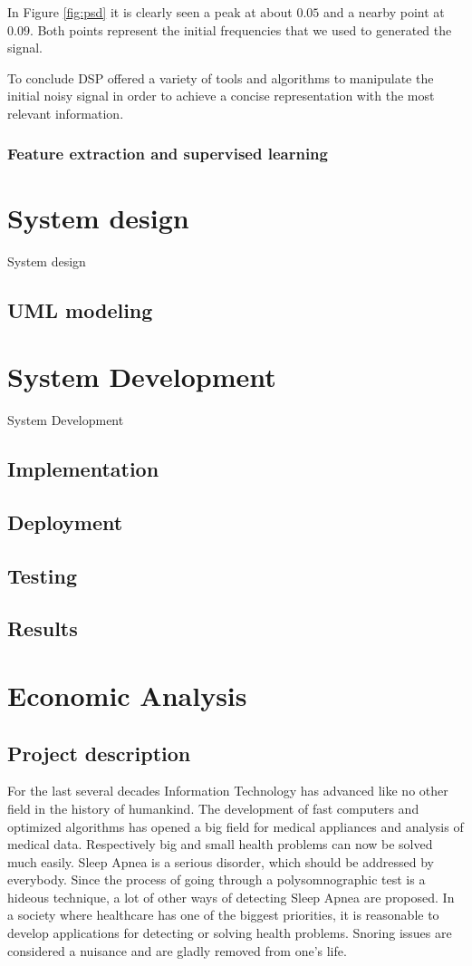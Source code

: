 \documentclass[12pt,a4paper]{report}
\begin{document}
In Figure \ref{fig:psd} it is clearly seen a peak at about $0.05$ and a nearby point at $0.09$. Both points represent the initial frequencies that we used to generated the signal. 

To conclude DSP offered a variety of tools and algorithms to manipulate the initial noisy signal in order to achieve a concise representation with the most relevant information.

\subsection{Feature extraction and supervised learning}


\chapter{System design}\label{chap:design}
System design
\section{UML modeling}

\chapter{System Development}\label{chap:development}
System Development
\section{Implementation}
\section{Deployment}
\section{Testing}
\section{Results}

\chapter{Economic Analysis}\label{chap:economy}
\section{Project description}
For the last several decades Information Technology has advanced like no other field in the history of humankind. The development of fast computers and optimized algorithms has opened a big field for medical appliances and analysis of medical data. Respectively big and small health problems can now be solved much easily. Sleep Apnea is a serious disorder, which should be addressed by everybody. Since the process of going through a polysomnographic test is a hideous technique, a lot of other ways of detecting Sleep Apnea are proposed. In a society where healthcare has one of the biggest priorities, it is reasonable to develop applications for detecting or solving health problems. Snoring issues are considered a nuisance and are gladly removed from one's life.
\end{document}
